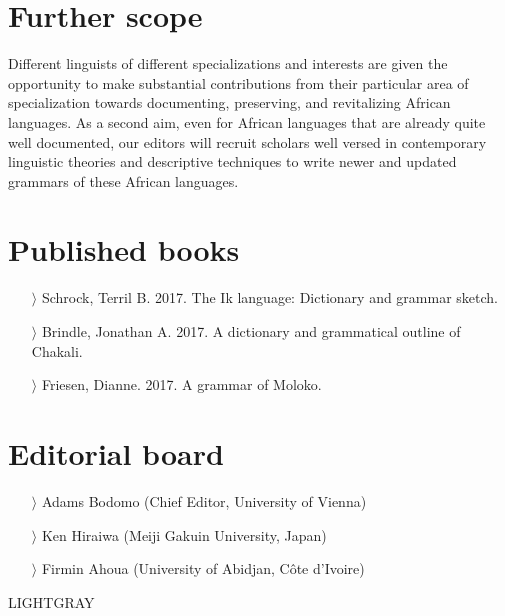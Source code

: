 \documentclass[
notumble,
nofoldmark,
]{leaflet}
\begin{document}
 
{
    \section{Further scope}    

Different linguists of different specializations and interests
are given the opportunity to make substantial contributions from their particular area of specialization towards documenting, preserving, and revitalizing African languages. 
As a second aim, even for African languages that are already quite well documented, our editors will recruit scholars well versed in contemporary linguistic theories and descriptive techniques to write newer and updated grammars of these African languages.

\section{Published books}  
\raggedright
    \begin{itemize}
    \item[$\rangle$]Schrock, Terril B. 2017. The Ik language: Dictionary and grammar sketch. 
    \item[$\rangle$]Brindle, Jonathan A. 2017. A dictionary and grammatical outline of Chakali.
    \item[$\rangle$]Friesen, Dianne. 2017. A grammar of Moloko.
    \end{itemize}

    \section{Editorial board}    
\raggedright
    \begin{itemize}
    \item[$\rangle$] Adams Bodomo (Chief Editor, University of Vienna)
    \item[$\rangle$]Ken Hiraiwa (Meiji Gakuin University, Japan)
    \item[$\rangle$]Firmin Ahoua (University of Abidjan, Côte d'Ivoire)
    \end{itemize}
    
    
    
    
    
     }{LIGHTGRAY}
 
 
\end{document}
